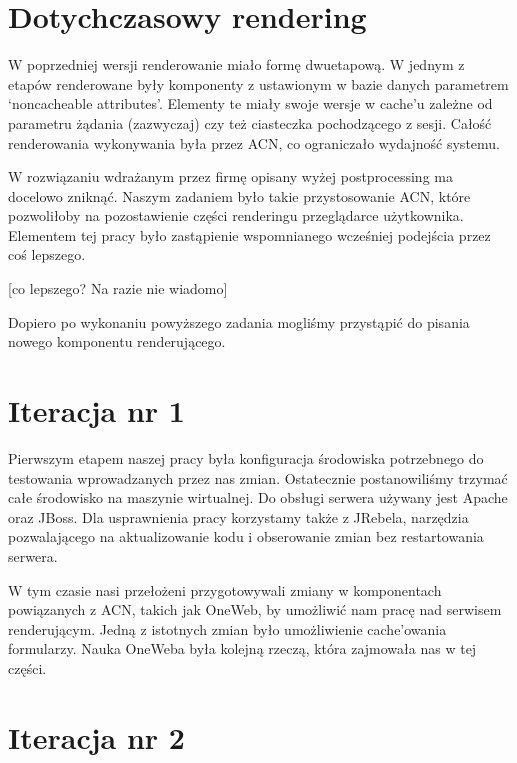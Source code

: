 \documentclass[licencjacka]{pracamgr}
\begin{document}
\section{Dotychczasowy rendering}

W poprzedniej wersji renderowanie miało formę dwuetapową. W jednym z etapów renderowane były komponenty z ustawionym w bazie danych parametrem ‘noncacheable attributes’. Elementy te miały swoje wersje w cache’u zależne od parametru żądania (zazwyczaj) czy też ciasteczka pochodzącego z sesji. Całość renderowania wykonywania była przez ACN, co ograniczało wydajność systemu.

\vspace{1mm}

W rozwiązaniu wdrażanym przez firmę opisany wyżej postprocessing ma docelowo zniknąć. Naszym zadaniem było takie przystosowanie ACN, które pozwoliłoby na pozostawienie części renderingu przeglądarce użytkownika. Elementem tej pracy było zastąpienie wspomnianego wcześniej podejścia przez coś lepszego.

	[co lepszego? Na razie nie wiadomo]
	
\vspace{1mm}	
	
Dopiero po wykonaniu powyższego zadania mogliśmy przystąpić do pisania nowego komponentu renderującego.

\section{Iteracja nr 1}
	
Pierwszym etapem naszej pracy była konfiguracja środowiska potrzebnego do testowania wprowadzanych przez nas zmian. Ostatecznie postanowiliśmy trzymać całe środowisko na maszynie wirtualnej. Do obsługi serwera używany jest Apache oraz JBoss. Dla usprawnienia pracy korzystamy także z JRebela, narzędzia pozwalającego na aktualizowanie kodu i obserowanie zmian bez restartowania serwera.

\vspace{1mm}

W tym czasie nasi przełożeni przygotowywali zmiany w komponentach powiązanych z ACN, takich jak OneWeb, by umożliwić nam pracę nad serwisem renderującym. Jedną z istotnych zmian było umożliwienie cache’owania formularzy. Nauka OneWeba była kolejną rzeczą, która zajmowała nas w tej części.
	
\section{Iteracja nr 2}
\end{document}
